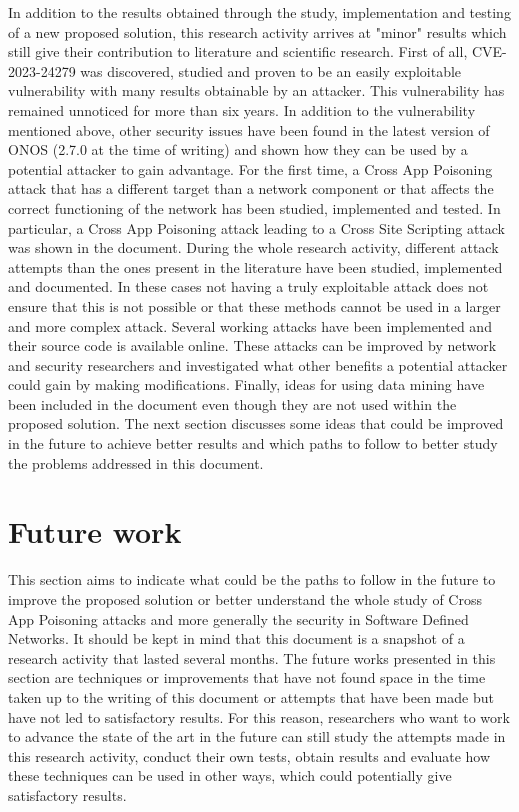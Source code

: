 \documentclass[a4paper,10pt]{memoir}
\begin{document}
{%
In addition to the results obtained through the study, implementation and testing of a new proposed solution, this research activity arrives at "minor" results which still give their contribution to literature and scientific research. First of all, CVE-2023-24279 was discovered, studied and proven to be an easily exploitable vulnerability with many results obtainable by an attacker. This vulnerability has remained unnoticed for more than six years. In addition to the vulnerability mentioned above, other security issues have been found in the latest version of ONOS (2.7.0 at the time of writing) and shown how they can be used by a potential attacker to gain advantage. For the first time, a Cross App Poisoning attack that has a different target than a network component or that affects the correct functioning of the network has been studied, implemented and tested. In particular, a Cross App Poisoning attack leading to a Cross Site Scripting attack was shown in the document. During the whole research activity, different attack attempts than the ones present in the literature have been studied, implemented and documented. In these cases not having a truly exploitable attack does not ensure that this is not possible or that these methods cannot be used in a larger and more complex attack. Several working attacks have been implemented and their source code is available online. These attacks can be improved by network and security researchers and investigated what other benefits a potential attacker could gain by making modifications. Finally, ideas for using data mining have been included in the document even though they are not used within the proposed solution. The next section discusses some ideas that could be improved in the future to achieve better results and which paths to follow to better study the problems addressed in this document.

\clearpage

\section{Future work}
This section aims to indicate what could be the paths to follow in the future to improve the proposed solution or better understand the whole study of Cross App Poisoning attacks and more generally the security in Software Defined Networks. It should be kept in mind that this document is a snapshot of a research activity that lasted several months. The future works presented in this section are techniques or improvements that have not found space in the time taken up to the writing of this document or attempts that have been made but have not led to satisfactory results. For this reason, researchers who want to work to advance the state of the art in the future can still study the attempts made in this research activity, conduct their own tests, obtain results and evaluate how these techniques can be used in other ways, which could potentially give satisfactory results.
\medskip

}
\end{document}
